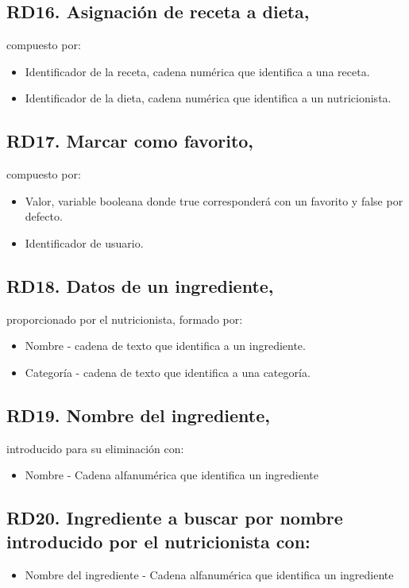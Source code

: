 \documentclass[12pt,letterpaper]{article}
\begin{document}
\subsection{RD16. Asignación de receta a dieta,} compuesto por:
\begin{itemize}
\item Identificador de la receta, cadena numérica que identifica a una receta.
\item Identificador de la dieta, cadena numérica que identifica a un nutricionista.

\end{itemize} 
\subsection{RD17. Marcar como favorito,} compuesto por:
\begin{itemize}
\item Valor, variable booleana donde true corresponderá con un favorito y false por defecto.
\item Identificador de usuario.

\end{itemize} 
\subsection{RD18. Datos de un ingrediente,} proporcionado por el nutricionista, formado por:
\begin{itemize}
\item Nombre -  cadena de texto que identifica a un ingrediente.
\item Categoría - cadena de texto que identifica a una categoría.

\end{itemize} 
\subsection{RD19. Nombre del ingrediente,}  introducido para su eliminación con: 
\begin{itemize}
\item Nombre - Cadena alfanumérica que identifica un ingrediente

\end{itemize} 
\subsection{RD20. Ingrediente a buscar por nombre introducido por el nutricionista con: }
\begin{itemize}
\item Nombre del ingrediente  - Cadena alfanumérica que identifica un ingrediente

\end{itemize} 
\end{document}
